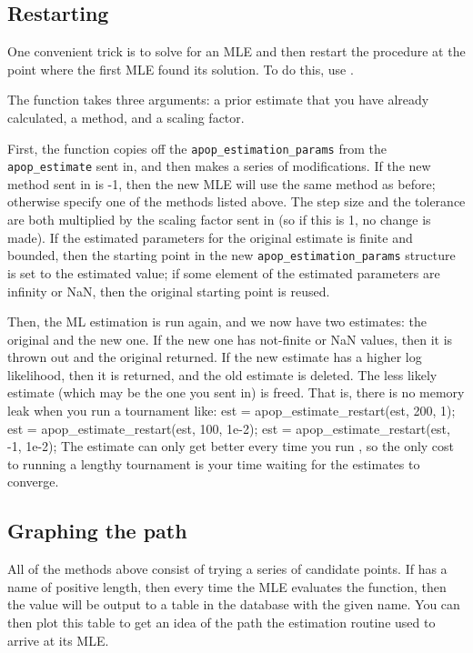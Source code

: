 \subsection{Restarting} One convenient trick is to solve for an MLE and
then restart the procedure at the point where the first MLE found its solution.
To do this, use .

The function takes three arguments: a prior estimate that you have
already calculated, a method, and a scaling factor. 

First, the function copies off the {\tt apop\_\-estimation\_\-params}
from the {\tt apop\_\-estimate} sent in, and then makes a series of
modifications.  If the new method sent in is -1, then the new MLE will
use the same method as before; otherwise specify one of the methods
listed above. The step size and the tolerance are both multiplied by the
scaling factor sent in (so if this is 1, no change is made). If the
estimated parameters for the original estimate is finite and bounded, then 
the starting point in the new {\tt apop\_\-estimation\_\-params}
structure is set to the estimated value; if some element of the
estimated parameters are infinity or NaN, then the original starting
point is reused.

Then, the ML estimation is run again, and we now have two estimates: the
original and the new one. If the new one has not-finite or NaN values,
then it is thrown out and the original returned. If the new estimate 
has a higher log likelihood, then it is returned, and the old estimate
is deleted.  The less likely estimate (which may be the one you sent in) is freed. That is,
there is no memory leak when you run a tournament like:
est = apop_estimate_restart(est, 200, 1);
est = apop_estimate_restart(est, 100, 1e-2);
est = apop_estimate_restart(est, -1, 1e-2);
The estimate can only get better every time you run
, so the only cost to running a lengthy
tournament is your time waiting for the estimates to converge.

\subsection{Graphing the path} All of the methods above consist of
trying a series of candidate points. 
If 
has a name of positive
length, then every time the MLE evaluates the function, then the value
will be output to a table in the database with the given name. You can
then plot this table to get an idea of the path the estimation routine
used to arrive at its MLE.


